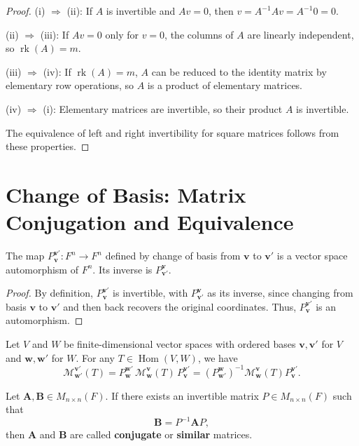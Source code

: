 \begin{proof}
  (i) $\Rightarrow$ (ii): If $A$ is invertible and $Av = 0$, then $v = A^{-1}Av = A^{-1}0 = 0$.

  (ii) $\Rightarrow$ (iii): If $Av = 0$ only for $v = 0$, the columns of $A$ are linearly independent, so $\operatorname{rk}(A) = m$.

  (iii) $\Rightarrow$ (iv): If $\operatorname{rk}(A) = m$, $A$ can be reduced to the identity matrix by elementary row operations, so $A$ is a product of elementary matrices.

  (iv) $\Rightarrow$ (i): Elementary matrices are invertible, so their product $A$ is invertible.

  The equivalence of left and right invertibility for square matrices follows from these properties.
\end{proof}

\section{Change of Basis: Matrix Conjugation and Equivalence}

\begin{lemma}
  The map $P_{\mathbf{v}}^{\mathbf{v}'}: F^n \to F^n$ defined by change of basis from $\mathbf{v}$ to $\mathbf{v}'$ is a vector space automorphism of $F^n$. Its inverse is $P_{\mathbf{v}'}^{\mathbf{v}}$.
\end{lemma}

\begin{proof}
  By definition, $P_{\mathbf{v}}^{\mathbf{v}'}$ is invertible, with $P_{\mathbf{v}'}^{\mathbf{v}}$ as its inverse, since changing from basis $\mathbf{v}$ to $\mathbf{v}'$ and then back recovers the original coordinates. Thus, $P_{\mathbf{v}}^{\mathbf{v}'}$ is an automorphism.
\end{proof}

\begin{theorem}
  Let $V$ and $W$ be finite-dimensional vector spaces with ordered bases $\mathbf{v}, \mathbf{v}'$ for $V$ and $\mathbf{w}, \mathbf{w}'$ for $W$. For any $T \in \operatorname{Hom}(V, W)$, we have
  \[
    \mathcal{M}_{\mathbf{w}'}^{\mathbf{v}'}(T) = P_{\mathbf{w}}^{\mathbf{w}'} \, \mathcal{M}_{\mathbf{w}}^{\mathbf{v}}(T) \, P_{\mathbf{v}}^{\mathbf{v}'}
    = (P_{\mathbf{w}'}^{\mathbf{w}})^{-1} \mathcal{M}_{\mathbf{w}}^{\mathbf{v}}(T) P_{\mathbf{v}}^{\mathbf{v}'}.
  \]
\end{theorem}

\begin{definition}
  Let $\mathbf{A}, \mathbf{B} \in M_{n \times n}(F)$. If there exists an invertible matrix $P \in M_{n \times n}(F)$ such that
  \[
    \mathbf{B} = P^{-1} \mathbf{A} P,
  \]
  then $\mathbf{A}$ and $\mathbf{B}$ are called \textbf{conjugate} or \textbf{similar} matrices.
\end{definition}

